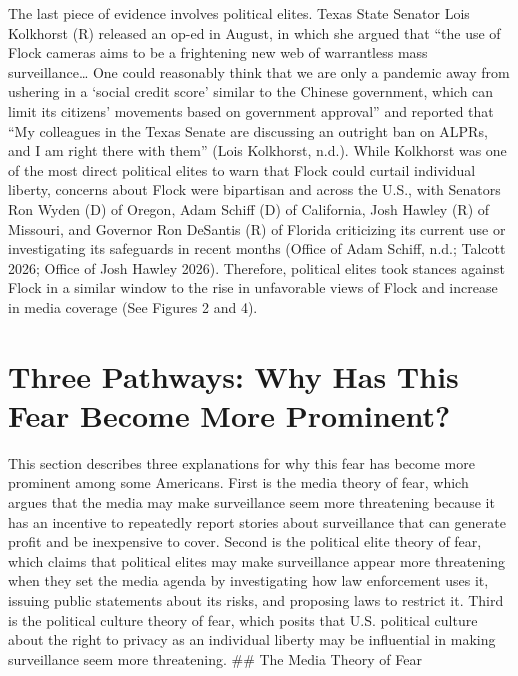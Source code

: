 \documentclass[
  american,
  12pt,
  letterpaper,
]{article}
\begin{document}
The last piece of evidence involves political elites. Texas State
Senator Lois Kolkhorst (R) released an op-ed in August, in which she
argued that ``the use of Flock cameras aims to be a frightening new web
of warrantless mass surveillance\ldots{} One could reasonably think that
we are only a pandemic away from ushering in a `social credit score'
similar to the Chinese government, which can limit its citizens'
movements based on government approval'' and reported that ``My
colleagues in the Texas Senate are discussing an outright ban on ALPRs,
and I am right there with them'' (Lois Kolkhorst, n.d.). While Kolkhorst
was one of the most direct political elites to warn that Flock could
curtail individual liberty, concerns about Flock were bipartisan and
across the U.S., with Senators Ron Wyden (D) of Oregon, Adam Schiff (D)
of California, Josh Hawley (R) of Missouri, and Governor Ron DeSantis
(R) of Florida criticizing its current use or investigating its
safeguards in recent months (Office of Adam Schiff, n.d.; Talcott 2026;
Office of Josh Hawley 2026). Therefore, political elites took stances
against Flock in a similar window to the rise in unfavorable views of
Flock and increase in media coverage (See Figures 2 and 4).

\section{Three Pathways: Why Has This Fear Become More
Prominent?}\label{three-pathways-why-has-this-fear-become-more-prominent}

This section describes three explanations for why this fear has become
more prominent among some Americans. First is the media theory of fear,
which argues that the media may make surveillance seem more threatening
because it has an incentive to repeatedly report stories about
surveillance that can generate profit and be inexpensive to cover.
Second is the political elite theory of fear, which claims that
political elites may make surveillance appear more threatening when they
set the media agenda by investigating how law enforcement uses it,
issuing public statements about its risks, and proposing laws to
restrict it. Third is the political culture theory of fear, which posits
that U.S. political culture about the right to privacy as an individual
liberty may be influential in making surveillance seem more threatening.
\#\# The Media Theory of Fear
\end{document}
